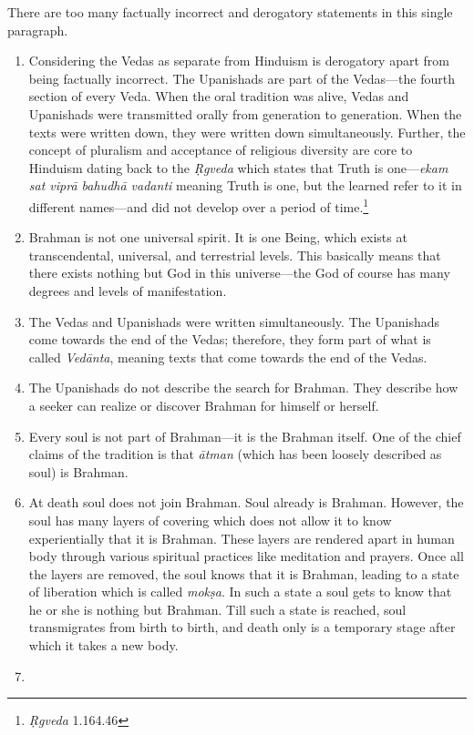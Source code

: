 There are too many factually incorrect and derogatory statements in this single paragraph.
\begin{enumerate}
\itemsep=1pt
\item 
  Considering the Vedas as separate from Hinduism is derogatory apart from being factually incorrect. The Upanishads are part of the Vedas—the fourth section of every Veda. When the oral tradition was alive, Vedas and Upanishads were transmitted orally from generation to generation. When the texts were written down, they were written down simultaneously. Further, the concept of pluralism and acceptance of religious diversity are core to Hinduism dating back to the \textit{Ṛgveda} which states that Truth is one—\textit{ekam sat viprā bahudhā vadanti} meaning Truth is one, but the learned refer to it in different names—and did not develop over a period of time.\footnote{\textit{Ṛgveda} 1.164.46}
\item 
Brahman is not one universal spirit. It is one Being, which exists at transcendental, universal, and terrestrial levels. This basically means that there exists nothing but God in this universe—the God of course has many degrees and levels of manifestation. 
\item 
The Vedas and Upanishads were written simultaneously. The Upanishads come towards the end of the Vedas; therefore, they form part of what is called \textit{Vedānta}, meaning texts that come towards the end of the Vedas. 
\item 
The Upanishads do not describe the search for Brahman. They describe how a seeker can realize or discover Brahman for himself or herself. 
\item 
Every soul is not part of Brahman—it is the Brahman itself. One of the chief claims of the tradition is that \textit{ātman} (which has been loosely described as soul) is Brahman. 
\item 
At death soul does not join Brahman. Soul already is Brahman. However, the soul has many layers of covering which does not allow it to know experientially that it is Brahman. These layers are rendered apart in human body through various spiritual practices like meditation and prayers. Once all the layers are removed, the soul knows that it is Brahman, leading to a state of liberation which is called \textit{mokṣa}. In such a state a soul gets to know that he or she is nothing but Brahman. Till such a state is reached, soul transmigrates from birth to birth, and death only is a temporary stage after which it takes a new body.
\item 

\end{enumerate}
